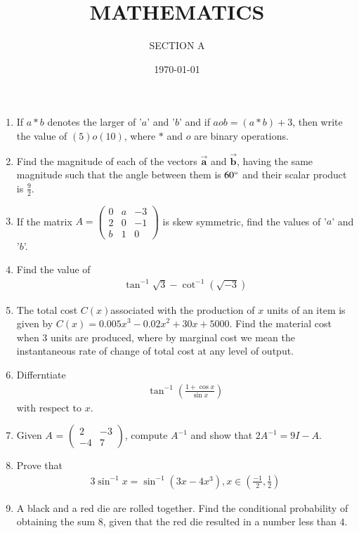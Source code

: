 \documentclass[10pt,-letter paper]{article}
\title{MATHEMATICS}
\author{SECTION A}
\date{\today}
\providecommand{\brak}[1]{\ensuremath{\left(#1\right)}}
\newcommand{\myvec}[1]{\ensuremath{\begin{pmatrix}#1\end{pmatrix}}}
\begin{document}
\maketitle

\begin{enumerate}

	\item  If $a*b$ denotes the larger of '$a$' and '$b$' and if $a o b = \brak{a * b} + 3$, then write the value of $\brak{5} o \brak{10}$, where $*$ and $o$ are binary operations.

	\item Find the magnitude of each of the vectors $\overrightarrow{\mathbf{a}}$ and $\overrightarrow{\mathbf{b}}$, having the same magnitude such that the angle between them is ${60\degree}$ and their scalar product is $\frac{9}{2}$.

\item  If the matrix $A = \myvec{ 0 & a & -3 \\ 2 & 0 & -1 \\ b & 1 & 0 }$ is skew symmetric, find the values of '$a$' and '$b$'.

\item Find the value of
	\begin{align*}
		\tan^{-1}\sqrt{3}-\cot^{-1}\brak{\sqrt{-3}}
	\end{align*}

\item The total cost $C\brak{x}$associated with the production of $x$ units of an item is given by $C\brak{x} = {0.005x}^3-{0.02x}^2+30x+5000$. Find the material cost when $3$ units are produced, where by marginal cost we mean the instantaneous rate of change of total cost at any level of output.

\item Differntiate 
	\begin{align*}
	 \tan^{-1}\brak{\frac{1+\cos x}{\sin x}} 
	\end{align*} 
		with respect to $x$.
\item Given $A$ = $\myvec{ 2 & -3 \\ -4 & 7 }$, compute $A^{-1}$ and show that $2A^{-1} = 9I-A$.
		\item Prove that 
			\begin{align*}
		3\sin^{-1}x=\sin^{-1}\brak{3x-4x^3}, x\in\brak{\frac{-1}{2},\frac{1}{2}}
			\end{align*} 
		
\item A black and a red die are rolled together. Find the conditional probability of obtaining the sum $8$, given that the red die resulted in a number less than $4$.


\end{enumerate}
\end{document}
